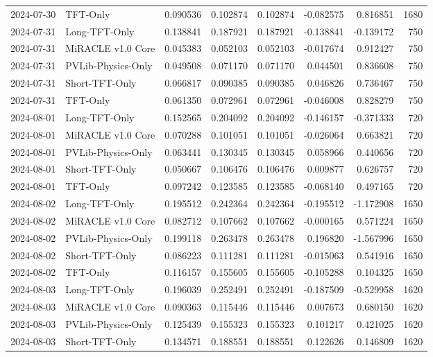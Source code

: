 \begin{tabular}{llrrrrrr}
2024-07-30 & TFT-Only & 0.090536 & 0.102874 & 0.102874 & -0.082575 & 0.816851 & 1680 \\
2024-07-31 & Long-TFT-Only & 0.138841 & 0.187921 & 0.187921 & -0.138841 & -0.139172 & 750 \\
2024-07-31 & MiRACLE v1.0 Core & 0.045383 & 0.052103 & 0.052103 & -0.017674 & 0.912427 & 750 \\
2024-07-31 & PVLib-Physics-Only & 0.049508 & 0.071170 & 0.071170 & 0.044501 & 0.836608 & 750 \\
2024-07-31 & Short-TFT-Only & 0.066817 & 0.090385 & 0.090385 & 0.046826 & 0.736467 & 750 \\
2024-07-31 & TFT-Only & 0.061350 & 0.072961 & 0.072961 & -0.046008 & 0.828279 & 750 \\
2024-08-01 & Long-TFT-Only & 0.152565 & 0.204092 & 0.204092 & -0.146157 & -0.371333 & 720 \\
2024-08-01 & MiRACLE v1.0 Core & 0.070288 & 0.101051 & 0.101051 & -0.026064 & 0.663821 & 720 \\
2024-08-01 & PVLib-Physics-Only & 0.063441 & 0.130345 & 0.130345 & 0.058966 & 0.440656 & 720 \\
2024-08-01 & Short-TFT-Only & 0.050667 & 0.106476 & 0.106476 & 0.009877 & 0.626757 & 720 \\
2024-08-01 & TFT-Only & 0.097242 & 0.123585 & 0.123585 & -0.068140 & 0.497165 & 720 \\
2024-08-02 & Long-TFT-Only & 0.195512 & 0.242364 & 0.242364 & -0.195512 & -1.172908 & 1650 \\
2024-08-02 & MiRACLE v1.0 Core & 0.082712 & 0.107662 & 0.107662 & -0.000165 & 0.571224 & 1650 \\
2024-08-02 & PVLib-Physics-Only & 0.199118 & 0.263478 & 0.263478 & 0.196820 & -1.567996 & 1650 \\
2024-08-02 & Short-TFT-Only & 0.086223 & 0.111281 & 0.111281 & -0.015063 & 0.541916 & 1650 \\
2024-08-02 & TFT-Only & 0.116157 & 0.155605 & 0.155605 & -0.105288 & 0.104325 & 1650 \\
2024-08-03 & Long-TFT-Only & 0.196039 & 0.252491 & 0.252491 & -0.187509 & -0.529958 & 1620 \\
2024-08-03 & MiRACLE v1.0 Core & 0.090363 & 0.115446 & 0.115446 & 0.007673 & 0.680150 & 1620 \\
2024-08-03 & PVLib-Physics-Only & 0.125439 & 0.155323 & 0.155323 & 0.101217 & 0.421025 & 1620 \\
2024-08-03 & Short-TFT-Only & 0.134571 & 0.188551 & 0.188551 & 0.122626 & 0.146809 & 1620 \\

\end{tabular}
